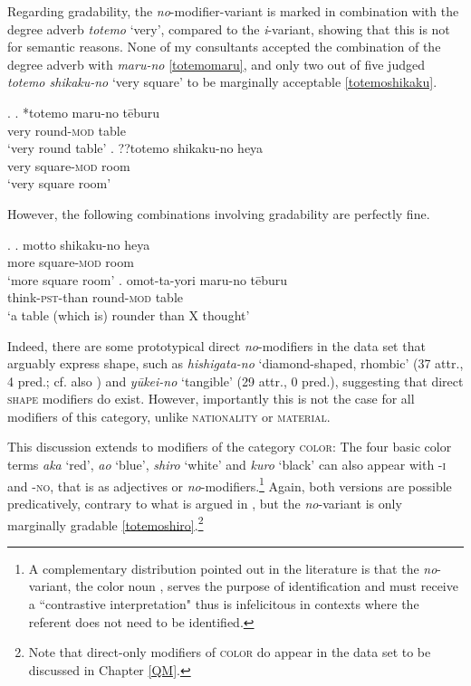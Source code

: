 \documentclass [output=book,colorlinks,citecolor=brown]{langscibook}
\begin{document}
Regarding gradability, the \textit{no}-modifier-variant is marked in combination with the degree adverb \textit{totemo} `very’, compared to the \textit{i}-variant, showing that this is not for semantic reasons. None of my consultants accepted the combination of the degree adverb with \textit{maru-no} \ref{totemomaru}, and only two out of five judged \textit{totemo shikaku-no} `very square' to be marginally acceptable \ref{totemoshikaku}. %

\ex. \ag. *totemo maru-no tēburu\\
very round-\textsc{mod} table\\
`very round table' \label{totemomaru}
\bg. ??totemo shikaku-no heya\\
very square-\textsc{mod} room\\
`very square room' \label{totemoshikaku}

However, the following combinations involving gradability are perfectly fine.

\ex. \ag. motto shikaku-no heya\\
more square-\textsc{mod} room\\
`more square room’
\bg. omot-ta-yori maru-no tēburu\\
think-\textsc{pst}-than round-\textsc{mod} table\\
`a table (which is) rounder than X thought’

Indeed, there are some prototypical direct \textit{no}-modifiers in the data set that arguably express shape, such as \textit{hishigata-no} `diamond-shaped, rhombic' (37 attr., 4 pred.; cf. also \citealt[98]{morita:2011:three}) and \textit{yūkei-no} `tangible' (29 attr., 0 pred.), suggesting that direct \textsc{shape} modifiers do exist. However, importantly this is not the case for all modifiers of this category, unlike \textsc{nationality} or \textsc{material}. %

This discussion extends to modifiers of the category \textsc{color}: The four basic color terms \textit{aka} `red', \textit{ao} `blue', \textit{shiro} `white' and \textit{kuro} `black' can also appear with -\textsc{i} and -\textsc{no}, that is as adjectives or \textit{no}-modifiers.\footnote{A complementary distribution pointed out in the literature \citep{sawada:1992:meishi, kishita:2005:shikisai} is that the \textit{no}-variant, the color noun \citep{okami:2012:two, okami:2016:on}, serves the purpose of identification and must receive a ``contrastive interpretation" \citep{koopman:2016:further} thus is infelicitous in contexts where the referent does not need to be identified.} Again, both versions are possible predicatively, contrary to what is argued in \citet{morita:2011:three}, but the \textit{no}-variant is only marginally gradable \ref{totemoshiro}.\footnote{Note that direct-only modifiers of \textsc{color} do appear in the data set to be discussed in Chapter \ref{QM}.} %
\end{document}
